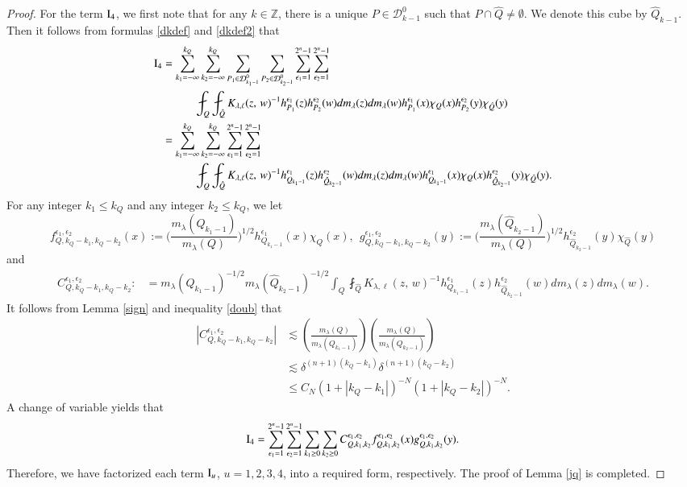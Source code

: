 \documentclass[12pt]{amsart}
\begin{document}
\begin{proof}
For the term ${\rm I}_4$, we first note that for any $k\in\mathbb{Z}$, there is a unique $P\in\mathcal{D}^0_{k-1}$ such that $P\cap \hat{Q}\neq\emptyset$. We denote this cube by $\hat{Q}_{k-1}$. Then it follows from formulas \eqref{dkdef} and \eqref{dkdef2} that
\begin{align*}
{\rm I}_4&=\sum_{k_1=-\infty}^{k_Q}\sum_{k_2=-\infty}^{k_Q}\sum_{P_1\in\mathcal{D}^0_{k_1-1}}\sum_{P_2\in\mathcal{D}^0_{k_2-1}}\sum_{\epsilon_1=1}^{2^n-1}\sum_{\epsilon_2=1}^{2^n-1}\\
&\hspace{1.0cm}\fint_Q\fint_{\hat{Q}}K_{\lambda,\ell}(z,\,w)^{-1}h_{P_1}^{\epsilon_1}(z)h_{P_2}^{\epsilon_2}(w)dm_\lambda(z)dm_\lambda(w)h_{P_1}^{\epsilon_1}(x)\chi_Q(x)h_{P_2}^{\epsilon_2}(y)\chi_{\hat{Q}}(y)\\
&=\sum_{k_1=-\infty}^{k_Q}\sum_{k_2=-\infty}^{k_Q}\sum_{\epsilon_1=1}^{2^n-1}\sum_{\epsilon_2=1}^{2^n-1}\\
&\hspace{1.0cm}\fint_Q\fint_{\hat{Q}}K_{\lambda,\ell}(z,\,w)^{-1}h_{Q_{k_1-1}}^{\epsilon_1}(z)h_{\hat{Q}_{k_2-1}}^{\epsilon_2}(w)dm_\lambda(z)dm_\lambda(w)h_{Q_{k_1-1}}^{\epsilon_1}(x)\chi_Q(x)h_{\hat{Q}_{k_2-1}}^{\epsilon_2}(y)\chi_{\hat{Q}}(y).
\end{align*}
For any integer $k_1\leq k_Q $ and any integer $k_2\leq k_Q$, we let $$f_{Q,k_Q-k_1,k_Q-k_2}^{\epsilon_1,\epsilon_2}(x):=\Big(\frac{m_{\lambda}(Q_{k_1-1})}{m_\lambda(Q)}\Big)^{1/2}h_{Q_{k_1-1}}^{\epsilon_1}(x)\chi_Q(x),\ \ g_{Q,k_Q-k_1,k_Q-k_2}^{\epsilon_1,\epsilon_2}(y):=\Big(\frac{m_{\lambda}(\hat{Q}_{k_2-1})}{m_\lambda(Q)}\Big)^{1/2}h_{\hat{Q}_{k_2-1}}^{\epsilon_2}(y)\chi_{\hat{Q}}(y)$$ and
\begin{align*}
C_{Q,k_Q-k_1,k_Q-k_2}^{\epsilon_1,\epsilon_2}:&=m_{\lambda}(Q_{k_1-1})^{-1/2}m_\lambda(\hat{Q}_{k_2-1})^{-1/2}\int_Q\fint_{\hat{Q}}K_{\lambda,\ell}(z,\,w)^{-1}h_{Q_{k_1-1}}^{\epsilon_1}(z)h_{\hat{Q}_{k_2-1}}^{\epsilon_2}(w)dm_\lambda(z)dm_\lambda(w).
\end{align*}
It follows from Lemma \ref{sign} and inequality \eqref{doub} that
\begin{align*}
|C_{Q,k_Q-k_1,k_Q-k_2}^{\epsilon_1,\epsilon_2}|&\lesssim \left(\frac{m_\lambda(Q)}{m_\lambda(Q_{k_1-1})}\right)\left(\frac{m_\lambda(Q)}{m_\lambda(Q_{k_2-1})}\right)\\
&\lesssim \delta^{(n+1)(k_Q-k_1)}\delta^{(n+1)(k_Q-k_2)}\\
&\leq C_N (1+|k_Q-k_1|)^{-N}(1+|k_Q-k_2|)^{-N}.
\end{align*}
A change of variable yields that $${\rm I}_4=\sum_{\epsilon_1=1}^{2^n-1}\sum_{\epsilon_2=1}^{2^n-1}\sum_{k_1\geq0}\sum_{k_2\geq0}C_{Q,k_1,k_2}^{\epsilon_1,\epsilon_2}f_{Q,k_1,k_2}^{\epsilon_1,\epsilon_2}(x)g_{Q,k_1,k_2}^{\epsilon_1,\epsilon_2}(y).$$
Therefore, we have factorized each term ${\rm I}_u$, $u=1,2,3,4$, into a required form, respectively. The proof of Lemma \ref{jq} is completed.
\end{proof}
\end{document}
